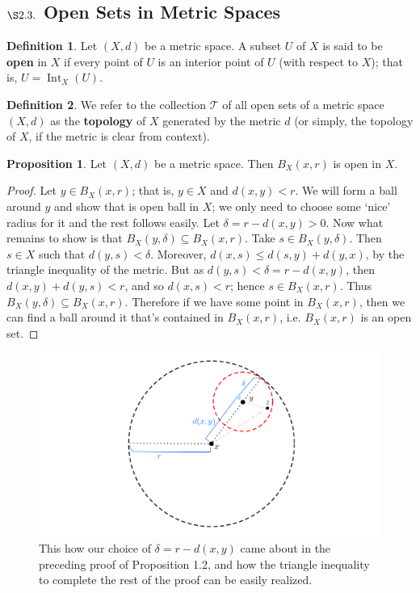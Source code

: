 \documentclass[9pt,reqno]{amsart}
\theoremstyle{definition}
\newtheorem{defi}{Definition}[section]
\newtheorem{prop}{Proposition}[section]
\DeclareMathOperator{\Int}{Int}
\begin{document}
\subsection{ $\S 2.3.$ Open Sets in Metric Spaces}
\begin{defi}
	Let $(X, d)$ be a metric space. A subset $U$ of $X$ is said to be \textbf{open} in $X$ if every point of $U$ is an interior point of $U$ (with respect to $X$); that is, $U = \Int_X( U)$.
\end{defi}
\begin{defi}
We refer to the collection $\mathcal T$ of all open sets of a metric space $(X,d)$ as the \textbf{topology}
of $X$ generated by the metric $d$ (or simply, the topology of $X$, if the metric is clear from context). 	
\end{defi}
\begin{prop}
	Let $(X,d)$ be a metric space. Then $B_X (x,r)$ is open in $X$.
\end{prop}
\begin{proof}
Let $y \in B_X(x,r)$; that is, $y \in X$ and $d(x,y) < r$. We will form a ball around $y$ and show that is open ball in $X$; we only need to choose some `nice' radius for it and the rest follows easily. Let $\delta = r-d(x,y) > 0$. Now what remains to show is that $B_X(y,\delta ) \subseteq B_X(x, r)$. Take $s \in B_X(y, \delta)$. Then $s \in X$ such that $d(y,s) < \delta$. Moreover, $d(x,s) \leq d(s,y) + d(y,x)$, by the triangle inequality of the metric. But as $d(y,s) < \delta = r-d(x,y)$, then $d(x,y)+d(y,s) < r$, and so $d(x,s) <r$; hence $s \in B_X(x,r)$. Thus $B_X(y,\delta ) \subseteq B_X(x,r)$. Therefore if we have some point in $B_X(x,r)$, then we can find a ball around it that's contained in $B_X(x,r)$, i.e. $B_X(x,r)$ is an open set.
\end{proof}
\begin{figure}[h!]
\includegraphics[scale=.5]{m_02.png}
\caption{This how our choice of $\delta = r-d(x,y)$ came about in the preceding proof of Proposition 1.2, and how the triangle inequality to complete the rest of the proof can be easily realized.}
\end{figure}
\end{document}
